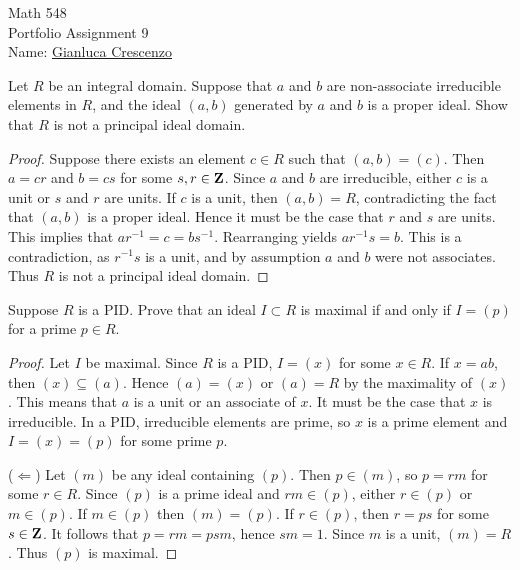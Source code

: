 \documentclass[11pt,twoside,openany]{memoir}
\begin{document}
\begin{center}
    {\Large Math 548 \\[0.1in]Portfolio Assignment 9}\\[.175in]
    {Name:} {\underline{Gianluca Crescenzo\hspace*{2in}}}\\[0.15in]
    \end{center}
    \vspace{4pt}
\begin{problem}[F25, P3]
Let $R$ be an integral domain. Suppose that $a$ and $b$ are non-associate irreducible elements in $R$, and the ideal $(a,b)$ generated by $a$ and $b$ is a proper ideal. Show that $R$ is not a principal ideal domain.
\end{problem}
    {\color{blue} \begin{proof}
        Suppose there exists an element $c \in R$ such that $(a,b) = (c)$. Then $a = cr$ and $b = cs$ for some $s,r \in \mathbf{Z}$. Since $a$ and $b$ are irreducible, either $c$ is a unit or $s$ and $r$ are units. If $c$ is a unit, then $(a,b) = R$, contradicting the fact that $(a,b)$ is a proper ideal. Hence it must be the case that $r$ and $s$ are units. This implies that $ar^{-1} = c = bs^{-1}$. Rearranging yields $ar^{-1}s = b$. This is a contradiction, as $r^{-1}s$ is a unit, and by assumption $a$ and $b$ were not associates. Thus $R$ is not a principal ideal domain.
    \end{proof}}
\begin{problem}[S23, P3]
Suppose $R$ is a PID. Prove that an ideal $I \subset R$ is maximal if and only if $I = (p)$ for a prime $p \in R$.
\end{problem}
    {\color{blue} \begin{proof}
        Let $I$ be maximal. Since $R$ is a PID, $I = (x)$ for some $x \in R$. If $x = ab$, then $(x) \subseteq (a)$. Hence $(a) = (x)$ or $(a) = R$ by the maximality of $(x)$. This means that $a$ is a unit or an associate of $x$. It must be the case that $x$ is irreducible. In a PID, irreducible elements are prime, so $x$ is a prime element and $I = (x) = (p)$ for some prime $p$.

        ($\Leftarrow$) Let $(m)$ be any ideal containing $(p)$. Then $p \in (m)$, so $p = rm$ for some $r \in R$. Since $(p)$ is a prime ideal and $rm \in (p)$, either $r \in (p)$ or $m \in (p)$. If $m \in (p)$ then $(m) = (p)$. If $r \in (p)$, then $r = ps$ for some $s \in \mathbf{Z}$. It follows that $p = rm = psm$, hence $sm = 1$. Since $m$ is a unit, $(m) = R$. Thus $(p)$ is maximal.
    \end{proof}}
\end{document}
